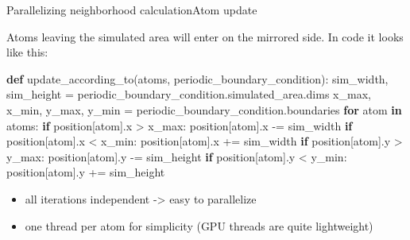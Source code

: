\documentclass[ignorenonframetext,aspectratio=169]{beamer}
\newenvironment{Shaded}{}{}
\newcommand{\ControlFlowTok}[1]{\textcolor[rgb]{0.00,0.44,0.13}{\textbf{#1}}}
\newcommand{\KeywordTok}[1]{\textcolor[rgb]{0.00,0.44,0.13}{\textbf{#1}}}
\newcommand{\NormalTok}[1]{#1}
\newcommand{\OperatorTok}[1]{\textcolor[rgb]{0.40,0.40,0.40}{#1}}
\providecommand{\tightlist}{%
  \setlength{\itemsep}{0pt}\setlength{\parskip}{0pt}}
\begin{document}
\begin{frame}[fragile]{Parallelizing neighborhood calculation}{Atom update}
    
    Atoms leaving the simulated area will enter on the mirrored side. In
    code it looks like this:
    \begin{scriptsize}
        \begin{Shaded}
            \begin{Highlighting}[]
\KeywordTok{def}\NormalTok{ update_according_to(atoms, periodic_boundary_condition):}
\NormalTok{  sim_width, sim_height }\OperatorTok{=}\NormalTok{ periodic_boundary_condition.simulated_area.dims}
\NormalTok{  x_max, x_min, y_max, y_min }\OperatorTok{=}\NormalTok{ periodic_boundary_condition.boundaries}
  \ControlFlowTok{for}\NormalTok{ atom }\KeywordTok{in}\NormalTok{ atoms:}
    \ControlFlowTok{if}\NormalTok{ position[atom].x }\OperatorTok{>}\NormalTok{ x_max:}
\NormalTok{      position[atom].x }\OperatorTok{-=}\NormalTok{ sim_width}
    \ControlFlowTok{if}\NormalTok{ position[atom].x }\OperatorTok{<}\NormalTok{ x_min:}
\NormalTok{      position[atom].x }\OperatorTok{+=}\NormalTok{ sim_width}
    \ControlFlowTok{if}\NormalTok{ position[atom].y }\OperatorTok{>}\NormalTok{ y_max:}
\NormalTok{      position[atom].y }\OperatorTok{-=}\NormalTok{ sim_height}
    \ControlFlowTok{if}\NormalTok{ position[atom].y }\OperatorTok{<}\NormalTok{ y_min:}
\NormalTok{      position[atom].y }\OperatorTok{+=}\NormalTok{ sim_height}
            \end{Highlighting}
        \end{Shaded}
    \end{scriptsize}

    \begin{itemize}
        \tightlist
        \item
          all iterations independent -\textgreater{} easy to parallelize
        \item one thread per atom for simplicity (GPU threads are quite lightweight)
    \end{itemize}
\end{frame}
\end{document}
